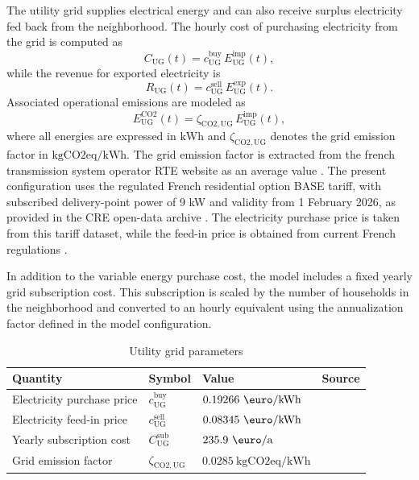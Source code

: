 \documentclass[12pt,a4paper]{report}
\begin{document}
The utility grid supplies electrical energy and can also receive surplus electricity fed back from the neighborhood. The hourly cost of purchasing electricity from the grid is computed as
\begin{equation}
C_{\mathrm{UG}}(t) = c_{\mathrm{UG}}^{\mathrm{buy}}\,E_{\mathrm{UG}}^{\mathrm{imp}}(t),
\label{eq:grid_cost}
\end{equation}
while the revenue for exported electricity is
\begin{equation}
R_{\mathrm{UG}}(t) = c_{\mathrm{UG}}^{\mathrm{sell}}\,E_{\mathrm{UG}}^{\mathrm{exp}}(t).
\label{eq:grid_revenue}
\end{equation}
Associated operational emissions are modeled as
\begin{equation}
E_{\mathrm{UG}}^{\mathrm{CO2}}(t) = \zeta_{\mathrm{CO2,UG}}\,E_{\mathrm{UG}}^{\mathrm{imp}}(t),
\label{eq:grid_emissions}
\end{equation}
where all energies are expressed in \(\mathrm{kWh}\) and \(\zeta_{\mathrm{CO2,UG}}\) denotes the grid emission factor in \(\mathrm{kgCO2eq/kWh}\). The grid emission factor is extracted from the french transmission system operator RTE website as an average value \cite{RTECO2}. The present configuration uses the regulated French residential option BASE tariff, with subscribed delivery-point power of 9 kW and validity from 1 February 2026, as provided in the CRE open-data archive \cite{cre_tariffs_residential_2026}. The electricity purchase price is taken from this tariff dataset, while the feed-in price is obtained from current French regulations \cite{service_public_surplus_2024}.  

In addition to the variable energy purchase cost, the model includes a fixed yearly grid subscription cost. This subscription is scaled by the number of households in the neighborhood and converted to an hourly equivalent using the annualization factor defined in the model configuration.

\begin{table}[H]
\centering
\caption{Utility grid parameters}
\label{tab:utility_grid_parameters}
\begin{tabular}{llll}
\hline
Quantity & Symbol & Value & Source \\
\hline
Electricity purchase price & \(c_{\mathrm{UG}}^{\mathrm{buy}}\) & \(0.19266~\mathrm{\text{\euro}/kWh}\) & \cite{cre_tariffs_residential_2026} \\
Electricity feed-in price & \(c_{\mathrm{UG}}^{\mathrm{sell}}\) & \(0.08345~\mathrm{\text{\euro}/kWh}\) & \cite{service_public_surplus_2024} \\
Yearly subscription cost & \(C_{\mathrm{UG}}^{\mathrm{sub}}\) & \(235.9~\mathrm{\text{\euro}/a}\) & \cite{cre_tariffs_residential_2026} \\
Grid emission factor & \(\zeta_{\mathrm{CO2,UG}}\) & \(0.0285~\mathrm{kgCO2eq/kWh}\) & \cite{RTECO2} \\
\hline
\end{tabular}
\end{table}
\end{document}
